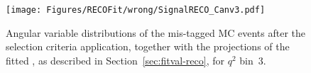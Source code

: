 




\begin{figure}[!hbt]
  \centering
  \texttt{[image: Figures/RECOFit/wrong/SignalRECO\_Canv3.pdf]}
  \caption{Angular variable distributions of the mis-tagged MC events after the selection criteria application, together with the projections of the fitted \pdf, as described in Section~\ref{sec:fitval-reco}, for $q^2$ bin~3.}
  \label{fig:wtag-bin3}
\end{figure}

